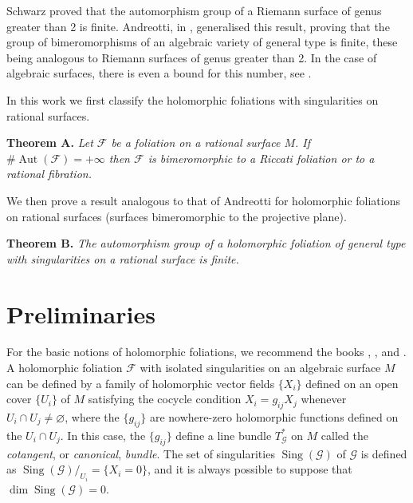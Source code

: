 \documentclass[british]{article}
\newenvironment{itenv}[1]
  {\phantomsection\par\smallskip\noindent\textbf{#1.}\itshape}
  {\par\smallskip}
\newcommand{\oldpage}[1]{\marginpar{\footnotesize$\Big\vert$ \textit{p.~#1}}}
\begin{document}
\oldpage{48}

Schwarz proved that the automorphism group of a Riemann surface of genus
greater than 2 is finite. Andreotti, in \autocite{1}, generalised this
result, proving that the group of bimeromorphisms of an algebraic
variety of general type is finite, these being analogous to Riemann
surfaces of genus greater than 2. In the case of algebraic surfaces,
there is even a bound for this number, see \autocite{14}.

In this work we first classify the holomorphic foliations with
singularities on rational surfaces.

\protect{}\label{theorem-A}
\begin{itenv}{Theorem A}
Let \({\mathcal{F}}\) be a foliation on a rational surface \(M\). If
\(\#\operatorname{Aut}({\mathcal{F}})=+\infty\) then \({\mathcal{F}}\)
is bimeromorphic to a Riccati foliation or to a rational fibration.

\end{itenv}

We then prove a result analogous to that of Andreotti for holomorphic
foliations on rational surfaces (surfaces bimeromorphic to the
projective plane).

\protect{}\label{theorem-B}
\begin{itenv}{Theorem B}
The automorphism group of a holomorphic foliation of general type with
singularities on a rational surface is finite.

\end{itenv}

\section{Preliminaries}\label{preliminaries}

For the basic notions of holomorphic foliations, we recommend the books
\autocite{4}, \autocite{13}, and \autocite{2}. A holomorphic foliation
\({\mathcal{F}}\) with isolated singularities on an algebraic surface
\(M\) can be defined by a family of holomorphic vector fields
\(\{X_i\}\) defined on an open cover \(\{U_i\}\) of \(M\) satisfying the
cocycle condition \(X_i=g_{ij}X_j\) whenever
\(U_i\cap U_j\neq\varnothing\), where the \(\{g_{ij}\}\) are
nowhere-zero holomorphic functions defined on the \(U_i\cap U_j\). In
this case, the \(\{g_{ij}\}\) define a line bundle \(T_{\mathcal{G}}^*\)
on \(M\) called the \emph{cotangent}, or \emph{canonical},
\emph{bundle}. The set of singularities
\(\operatorname{Sing}({\mathcal{G}})\) of \({\mathcal{G}}\) is defined
as \(\operatorname{Sing}({\mathcal{G}})/_{U_i}=\{X_i=0\}\), and it is
always possible to suppose that
\(\dim\operatorname{Sing}({\mathcal{G}})=0\).
\end{document}
